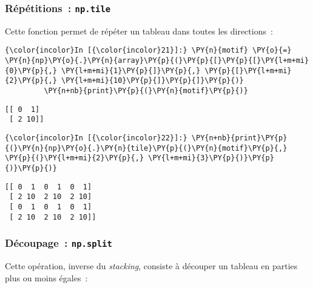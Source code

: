     \hypertarget{ruxe9puxe9titions-np.tile}{%
\subsubsection{\texorpdfstring{Répétitions~:
\texttt{np.tile}}{Répétitions~: np.tile}}\label{ruxe9puxe9titions-np.tile}}

    Cette fonction permet de répéter un tableau dans toutes les directions~:

    \begin{Verbatim}[commandchars=\\\{\},frame=single,framerule=0.3mm,rulecolor=\color{cellframecolor}]
{\color{incolor}In [{\color{incolor}21}]:} \PY{n}{motif} \PY{o}{=} \PY{n}{np}\PY{o}{.}\PY{n}{array}\PY{p}{(}\PY{p}{[}\PY{p}{[}\PY{l+m+mi}{0}\PY{p}{,} \PY{l+m+mi}{1}\PY{p}{]}\PY{p}{,} \PY{p}{[}\PY{l+m+mi}{2}\PY{p}{,} \PY{l+m+mi}{10}\PY{p}{]}\PY{p}{]}\PY{p}{)}
         \PY{n+nb}{print}\PY{p}{(}\PY{n}{motif}\PY{p}{)}
\end{Verbatim}


    \begin{Verbatim}[commandchars=\\\{\},frame=single,framerule=0.3mm,rulecolor=\color{cellframecolor}]
[[ 0  1]
 [ 2 10]]
\end{Verbatim}

    \begin{Verbatim}[commandchars=\\\{\},frame=single,framerule=0.3mm,rulecolor=\color{cellframecolor}]
{\color{incolor}In [{\color{incolor}22}]:} \PY{n+nb}{print}\PY{p}{(}\PY{n}{np}\PY{o}{.}\PY{n}{tile}\PY{p}{(}\PY{n}{motif}\PY{p}{,} \PY{p}{(}\PY{l+m+mi}{2}\PY{p}{,} \PY{l+m+mi}{3}\PY{p}{)}\PY{p}{)}\PY{p}{)}
\end{Verbatim}


    \begin{Verbatim}[commandchars=\\\{\},frame=single,framerule=0.3mm,rulecolor=\color{cellframecolor}]
[[ 0  1  0  1  0  1]
 [ 2 10  2 10  2 10]
 [ 0  1  0  1  0  1]
 [ 2 10  2 10  2 10]]
\end{Verbatim}

    \hypertarget{duxe9coupage-np.split}{%
\subsubsection{\texorpdfstring{Découpage~:
\texttt{np.split}}{Découpage~: np.split}}\label{duxe9coupage-np.split}}

    Cette opération, inverse du \emph{stacking}, consiste à découper un
tableau en parties plus ou moins égales~:

